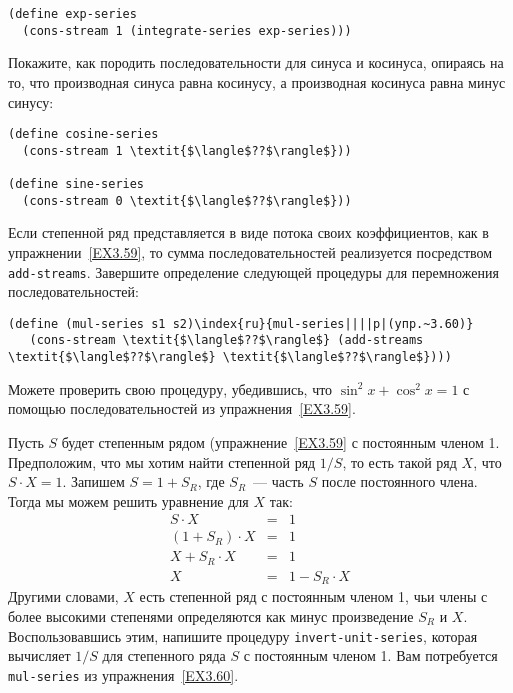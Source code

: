 \begin{exercise}{3.59}
\begin{plainenum}
\begin{Verbatim}[fontsize=\small]
(define exp-series
  (cons-stream 1 (integrate-series exp-series)))
\end{Verbatim}
Покажите, как породить последовательности для синуса и косинуса,
опираясь на то, что производная синуса равна косинусу, а производная
косинуса равна минус синусу:

\begin{Verbatim}[fontsize=\small]
(define cosine-series
  (cons-stream 1 \textit{$\langle$??$\rangle$}))

(define sine-series
  (cons-stream 0 \textit{$\langle$??$\rangle$}))
\end{Verbatim}
\end{plainenum}
\end{exercise}
\begin{exercise}{3.60}\label{EX3.60}%
Если степенной ряд представляется в виде потока своих
коэффициентов, как в упражнении~\ref{EX3.59}, то сумма
последовательностей реализуется посредством {\tt add-stre\-ams}.
Завершите определение следующей процедуры для   перемножения
последовательностей:

\begin{Verbatim}[fontsize=\small]
(define (mul-series s1 s2)\index{ru}{mul-series||||p|(упр.~3.60)}
   (cons-stream \textit{$\langle$??$\rangle$} (add-streams \textit{$\langle$??$\rangle$} \textit{$\langle$??$\rangle$})))
\end{Verbatim}
Можете проверить свою процедуру, убедившись, что
$\sin^2 x + \cos^2 x = 1$ с помощью последовательностей из
упражнения~\ref{EX3.59}.
\end{exercise}
\begin{exercise}{3.61}\label{EX3.61}%
Пусть $S$ будет степенным рядом
(упражнение~\ref{EX3.59} с постоянным членом 1.  Предположим, что мы
хотим найти степенной ряд $1/S$, то есть такой ряд
$X$, что $S \cdot X = 1$.  Запишем
$S = 1 + S_R$, где $S_R$~--- часть
$S$ после постоянного члена.  Тогда мы можем решить
уравнение для $X$ так:
$$
\begin{array}{rcl}
S \cdot X               & = & 1\\
(1 + S_R) \cdot X       & = & 1\\
X + S_R \cdot X         & = & 1\\
X                       & = & 1 - S_R \cdot X
\end{array}
$$
Другими словами, $X$ есть степенной ряд с постоянным членом
1, чьи члены с более высокими степенями определяются как минус
произведение $S_R$ и $X$.  Воспользовавшись этим,
напишите процедуру {\tt invert-unit-series}, которая
вычисляет $1/S$ для степенного ряда $S$ с
постоянным членом 1.  Вам потребуется {\tt mul-series} из
упражнения~\ref{EX3.60}.
\end{exercise}
